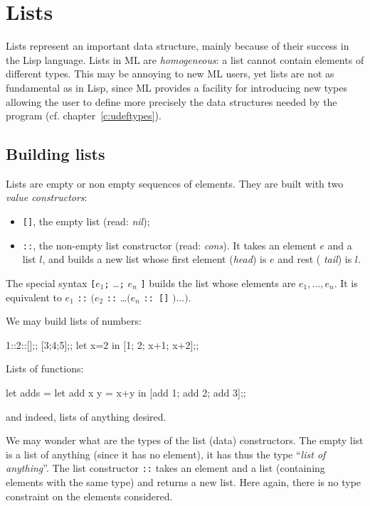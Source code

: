 \chapter{Lists}
\label{c:lists}

Lists represent an important data structure, mainly because of their success
in the Lisp language.
Lists in ML are {\it homogeneous\/}: a list cannot contain elements of
different types.
This may be annoying to new ML users, yet lists are not as fundamental
as in Lisp, since ML provides a facility for introducing new types allowing the
user to define more precisely the data structures needed by the
program (cf. chapter~\ref{c:udeftypes}).

\section{Building lists}

Lists are empty or non empty sequences of elements.
They are built with two {\it value constructors\/}:
\begin{itemize}
\item \verb"[]", the empty list (read: {\it nil\/});
\item \verb"::", the non-empty list constructor (read: {\it cons\/}). It takes an element $e$ and a list $l$,
and builds a new list whose first element ({\it head\/}) is $e$ and rest ({\it
tail\/}) is $l$.
\end{itemize}
The special syntax \verb"["$e_1$\verb";" \ldots\verb";" $e_n$ \verb"]"
builds the list whose elements are $e_1, \ldots, e_n$. It is
equivalent to $e_1$ \verb"::" $(e_2$ \verb"::" \ldots $(e_n$ \verb":: []"%
$)\ldots)$.


We may build lists of numbers:
\begin{caml_example}
1::2::[];;
[3;4;5];;
let x=2 in [1; 2; x+1; x+2];;
\end{caml_example}
Lists of functions:
\begin{caml_example}
let adds =
  let add x y = x+y
  in [add 1; add 2; add 3];;
\end{caml_example}
and indeed, lists of anything desired.


We may wonder what are the types of the list (data) constructors. The
empty list is a list of anything (since it has no element), it has
thus the type ``{\em list of anything}''. The list constructor
\verb|::| takes an element and a list (containing elements with the
same type) and returns a new list.  Here again, there is no type
constraint on the elements considered.

